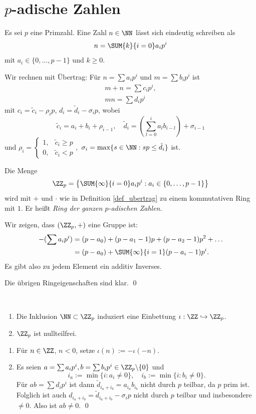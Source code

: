 
\section{$p$-adische Zahlen}\label{sec_padisch}

Es sei $p$ eine Primzahl. Eine Zahl $n\in\NN$ lässt sich eindeutig
schreiben als
\[
n = \SUM{k}{i=0} a_i p^i
\]
mit $a_i\in\{0,\ldots,p-1\}$ und $k\geq 0$.

\BEM\label{def_ubertrag}
Wir rechnen mit Übertrag: Für $n=\sum a_i p^i$ und
$m=\sum b_i p^i$ ist
\begin{gather*}
m+n = \sum c_i p^i, \\
mn = \sum d_i p^i
\end{gather*}
mit
$c_i = \tilde{c}_i - \rho_i p$,
$d_i = \tilde{d}_i - \sigma_i p$,
wobei 
\[
\tilde{c}_i=a_i+b_i+\rho_{i-1},\quad
\tilde{d}_i=(\sum_{l=0}^i a_l b_{i-l})+\sigma_{i-1}
\]
und
$\rho_i = \left\{\begin{matrix}
1, & \tilde{c}_i \geq p \\
0, & \tilde{c}_i < p
\end{matrix}\right.,$
$\sigma_i=\max\{s\in\NN:sp\leq \tilde{d}_i\}$
ist.

\DB Die Menge
\[
\ZZ_p = \left\{
\SUM{\infty}{i=0} a_i p^i : a_i \in \{0,\ldots,p-1\}
\right\}
\]
wird mit $+$ und $\cdot$ wie in Definition \ref{def_ubertrag}
zu einem kommutativen Ring mit $1$. Er heißt
\emph{Ring der ganzen $p$-adischen Zahlen}.

\bew Wir zeigen, dass $(\ZZ_p,+)$ eine Gruppe ist:
\begin{align*}
-(\sum a_i p^i) &= (p-a_0) + (p-a_1-1) p + (p-a_2-1) p^2 + \ldots \\
&= (p-a_0) + \SUM{\infty}{i=1} (p-a_i-1) p^i.
\end{align*}
Es gibt also zu jedem Element ein additiv Inverses.

Die übrigen Ringeigenschaften sind klar.
\qed

\PROP\ \begin{enumerate}
\item Die Inklusion $\NN\subset \ZZ_p$ induziert eine Einbettung
$\iota:\ZZ\hookrightarrow \ZZ_p$.
\item $\ZZ_p$ ist nullteilfrei.
\end{enumerate}
\bew \begin{enumerate}
\item Für $n\in\ZZ$, $n<0$, setze $\iota(n):=-\iota(-n)$.
\item Es seien $a=\sum a_i p^i, b=\sum b_i p^i \in \ZZ_p\backslash\{0\}$ und
\[
i_a := \min\{i:a_i \neq 0\},\quad
i_b := \min\{i:b_i \neq 0\}.
\]
Für $ab=\sum d_i p^i$ ist dann $\tilde{d}_{i_a+i_b}=a_{i_a}b_{i_b}$
nicht durch $p$ teilbar, da $p$ prim ist.
Folglich ist auch $d_{i_a+i_b}=\tilde{d}_{i_a+i_b}-\sigma_i p$
nicht durch $p$ teilbar und insbesondere $\neq 0$.
Also ist $ab\neq 0$.
\qed
\end{enumerate}

